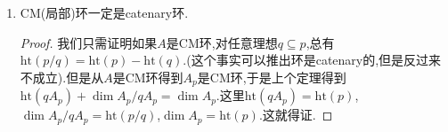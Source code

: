 \begin{enumerate}
\begin{proof}
		记$r=\mathrm{ht}(I)$,我们断言存在$a_1,a_2,\cdots,a_r\in I$,使得$\mathrm{ht}(a_1,a_2,\cdots,a_i)=i,\forall 1\le i\le r$.这个事实结合上一条命题得到$\{a_1,a_2,\cdots,a_r\}$是$A$正则序列,于是$\mathrm{depth}(I,A)\ge r$.首先$r=0$的情况平凡,设$r>0$,那么$I$不包含于$A$的任一极小素理想中,于是可取$a_1\in I$使得$\mathrm{ht}(a_1)=1$,于是$a_1$的任一极小素理想的高度都是1.倘若$\mathrm{ht}(I)>1$,则$I$不含于$a_1$的任一极小素理想之中,于是可取$a_2\in I$不在$(a_1)$的全部极小素理想的并中,此时有$\mathrm{ht}(a_1,a_2)=2$,倘若$\mathrm{ht}(I)>2$,以此类推得到结论.
		
		反过来取$b_1,b_2,\cdots,b_s\in I$是$A$正则序列,则上一定理得到$\mathrm{ht}(I)\ge\mathrm{ht}(b_1,b_2,\cdots,b_s)=s$.于是取上确界得到$\mathrm{ht}(I)\ge\mathrm{depth}(I,A)$.于是就有$\mathrm{ht}(I)=\mathrm{depth}(I,A)$.
		
		下面证明第二个等式.按照定义$\mathrm{ht}(I)=\inf\{\mathrm{ht}(p)\mid I\subseteq p,p\in\mathrm{Spec}(A)\}$.以及$\dim A/I=\sup\{\dim A/p\mid I\subseteq p,p\in\mathrm{Spec}(A)\}$.于是问题归结为对素理想$p$证明该等式成立:$\mathrm{ht}(p)+\dim A/p=\dim A$.
		
		记$r=\mathrm{ht}(p)=\dim A_p$,$n=\dim A$.我们之前证明过从$A$是CM环得到$A_p$也是CM环,并且有$\dim A_p=\mathrm{depth}(p,A)$.于是可取$a_1,a_2,\cdots,a_r\in p$是$A$正则序列.于是$A/(a_1,a_2,\cdots,a_r)$也是CM环,并且维数$n-r$.从$\mathrm{ht}(p)=r$得到$p$是$(a_1,a_2,\cdots,a_r)$的极小素理想,于是$p\in\mathrm{Ass}(A/(a_1,a_2,\cdots,a_r))$.我们证明过CM环的不可约分支的维数都相同,并且就是环的维数,于是$\dim A/p=\dim A/(a_1,a_2,\cdots,a_r)=n-r$.完成证明.
	\end{proof}
	\item CM(局部)环一定是catenary环.
	\begin{proof}
		
		我们只需证明如果$A$是CM环,对任意理想$q\subseteq p$,总有$\mathrm{ht}(p/q)=\mathrm{ht}(p)-\mathrm{ht}(q)$.(这个事实可以推出环是catenary的,但是反过来不成立).但是从$A$是CM环得到$A_p$是CM环,于是上个定理得到$\mathrm{ht}(qA_p)+\dim A_p/qA_p=\dim A_p$.这里$\mathrm{ht}(qA_p)=\mathrm{ht}(p)$,$\dim A_p/qA_p=\mathrm{ht}(p/q)$,$\dim A_p=\mathrm{ht}(p)$.这就得证.
	\end{proof}
\end{enumerate}

